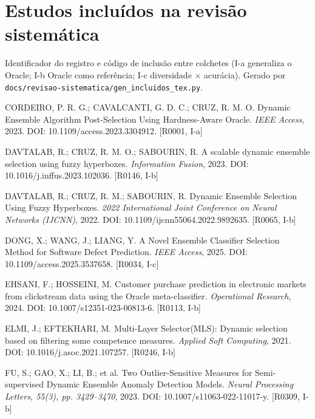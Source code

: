 \section*{Estudos incluídos na revisão sistemática}

{\small Identificador do registro e código de inclusão entre colchetes (I-a generaliza o Oracle; I-b Oracle como referência; I-c diversidade $\times$ acurácia). Gerado por \texttt{docs/revisao-sistematica/gen\_incluidos\_tex.py}.}

\begin{description}
\item CORDEIRO, P. R. G.; CAVALCANTI, G. D. C.; CRUZ, R. M. O. Dynamic Ensemble Algorithm Post-Selection Using Hardness-Aware Oracle. \emph{IEEE Access}, 2023. DOI: 10.1109/access.2023.3304912. [R0001, I-a]

\item DAVTALAB, R.; CRUZ, R. M. O.; SABOURIN, R. A scalable dynamic ensemble selection using fuzzy hyperboxes. \emph{Information Fusion}, 2023. DOI: 10.1016/j.inffus.2023.102036. [R0146, I-b]

\item DAVTALAB, R.; CRUZ, R. M.; SABOURIN, R. Dynamic Ensemble Selection Using Fuzzy Hyperboxes. \emph{2022 International Joint Conference on Neural Networks (IJCNN)}, 2022. DOI: 10.1109/ijcnn55064.2022.9892635. [R0065, I-b]

\item DONG, X.; WANG, J.; LIANG, Y. A Novel Ensemble Classifier Selection Method for Software Defect Prediction. \emph{IEEE Access}, 2025. DOI: 10.1109/access.2025.3537658. [R0034, I-c]

\item EHSANI, F.; HOSSEINI, M. Customer purchase prediction in electronic markets from clickstream data using the Oracle meta-classifier. \emph{Operational Research}, 2024. DOI: 10.1007/s12351-023-00813-6. [R0113, I-b]

\item ELMI, J.; EFTEKHARI, M. Multi-Layer Selector(MLS): Dynamic selection based on filtering some competence measures. \emph{Applied Soft Computing}, 2021. DOI: 10.1016/j.asoc.2021.107257. [R0246, I-b]

\item FU, S.; GAO, X.; LI, B.; et al. Two Outlier-Sensitive Measures for Semi-supervised Dynamic Ensemble Anomaly Detection Models. \emph{Neural Processing Letters, 55(3), pp. 3429--3470}, 2023. DOI: 10.1007/s11063-022-11017-y. [R0309, I-b]


\end{description}
